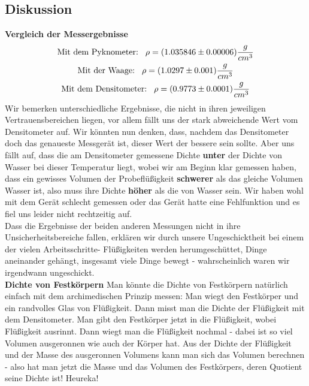 \documentclass{article}
\begin{document}
\subsection{Diskussion}
\textbf{Vergleich der Messergebnisse}
\begin{gather}
\text{Mit dem Pyknometer:}\hspace{0.3cm} \rho=(1.035846  \pm 0.00006 )\frac{g}{cm^3}\\
\text{Mit der Waage:}\hspace{0.3cm} \rho=(1.0297 \pm 0.001) \frac{g}{cm^3} \\
\text{Mit dem Densitometer:}\hspace{0.3cm} \rho=(0.9773 \pm 0.0001 )\frac{g}{cm^3}
\end{gather}
Wir bemerken unterschiedliche Ergebnisse, die nicht in ihren jeweiligen Vertrauensbereichen liegen, vor allem fällt uns der stark abweichende Wert vom Densitometer auf. Wir könnten nun denken, dass, nachdem das Densitometer doch das genaueste Messgerät ist, dieser Wert der bessere sein sollte. Aber uns fällt auf, dass die am Densitometer gemessene Dichte \textbf{unter} der Dichte von Wasser bei dieser Temperatur liegt, wobei wir am Beginn klar gemessen haben, dass ein gewisses Volumen der Probeflüßigkeit \textbf{schwerer} als das gleiche Volumen Wasser ist, also muss ihre Dichte \textbf{höher} als die von Wasser sein. Wir haben wohl mit dem Gerät schlecht gemessen oder das Gerät hatte eine Fehlfunktion und es fiel uns leider nicht rechtzeitig auf. \\
Dass die Ergebnisse der beiden anderen Messungen nicht in ihre Unsicherheitsbereiche fallen, erklären wir durch unsere Ungeschicktheit bei einem der vielen Arbeitsschritte- Flüßigkeiten werden herumgeschüttet, Dinge aneinander gehängt, insgesamt viele Dinge bewegt - wahrscheinlich waren wir irgendwann ungeschickt. \\
\textbf{Dichte von Festkörpern}
Man könnte die Dichte von Festkörpern natürlich einfach mit dem archimedischen Prinzip messen: Man wiegt den Festkörper und ein randvolles Glas von Flüßigkeit. Dann misst man die Dichte der Flüßigkeit mit dem Densitometer. Man gibt den Festkörper jetzt in die Flüßigkeit, wobei Flüßigkeit ausrinnt. Dann wiegt man die Flüßigkeit nochmal - dabei ist so viel Volumen ausgeronnen wie auch der Körper hat. Aus der Dichte der Flüßigkeit und der Masse des ausgeronnen Volumens kann man sich das Volumen berechnen - also hat man jetzt die Masse und das Volumen des Festkörpers, deren Quotient seine Dichte ist! Heureka!
\newpage
\end{document}
